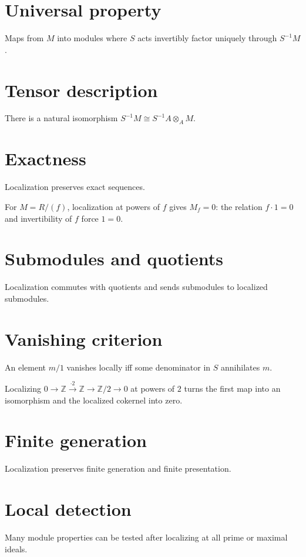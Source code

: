 \section{Universal property}
Maps from $M$ into modules where $S$ acts invertibly factor uniquely through $S^{-1}M$.

\section{Tensor description}
There is a natural isomorphism $S^{-1}M\cong S^{-1}A\otimes_A M$.

\section{Exactness}
Localization preserves exact sequences.

\begin{example}\label{ex:v07-expand-02}
For $M=R/(f)$, localization at powers of $f$ gives $M_f=0$: the relation $f\cdot1=0$ and invertibility of $f$ force $1=0$.
\end{example}
\section{Submodules and quotients}
Localization commutes with quotients and sends submodules to localized submodules.

\section{Vanishing criterion}
An element $m/1$ vanishes locally iff some denominator in $S$ annihilates $m$.

\begin{example}\label{ex:v07-expand-03}
Localizing $0\to\mathbb Z\xrightarrow{\cdot2}\mathbb Z\to\mathbb Z/2\to0$ at powers of $2$ turns the first map into an isomorphism and the localized cokernel into zero.
\end{example}
\section{Finite generation}
Localization preserves finite generation and finite presentation.

\section{Local detection}
Many module properties can be tested after localizing at all prime or maximal ideals.

